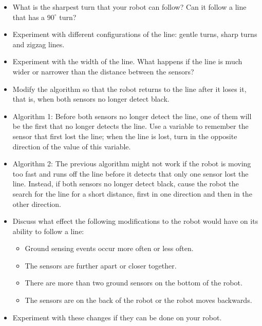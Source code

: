 \begin{framed}
\begin{itemize}
\item What is the sharpest turn that your robot can follow? Can it follow a line that has a $90^\circ$ turn?
\item Experiment with different configurations of the line: gentle turns, sharp turns and zigzag lines.
\item Experiment with the width of the line. What happens if the line is much wider or narrower than the distance between the sensors?
\end{itemize}
\end{framed}

\begin{framed}
\begin{itemize}
\item Modify the algorithm so that the robot returns to the line after it loses it, that is, when both sensors no longer detect black.
\item Algorithm 1: Before both sensors no longer detect the line, one of them will be the first that no longer detects the line. Use a variable to remember the sensor that first lost the line; when the line is lost, turn in the opposite direction of the value of this variable.
\item Algorithm 2: The previous algorithm might not work if the robot is moving too fast and runs off the line before it detects that only one sensor lost the line. Instead, if both sensors no longer detect black, cause the robot the search for the line for a short distance, first in one direction and then in the other direction.
\end{itemize}
\end{framed}

\begin{framed}
\begin{itemize}
\item Discuss what effect the following modifications to the robot would have on its ability to follow a line:
\begin{itemize}
\item Ground sensing events occur more often or less often.
\item The sensors are further apart or closer together.
\item There are more than two ground sensors on the bottom of the robot.
\item The sensors are on the back of the robot or the robot moves backwards.
\end{itemize}
\item Experiment with these changes if they can be done on your robot.
\end{itemize}
\end{framed}

